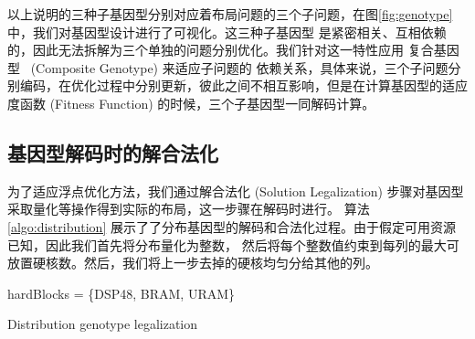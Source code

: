 以上说明的三种子基因型分别对应着布局问题的三个子问题，在图\ref{fig:genotype}中，我们对基因型设计进行了可视化。这三种子基因型
是紧密相关、互相依赖的，因此无法拆解为三个单独的问题分别优化。我们针对这一特性应用 复合基因型~\cite{opt4jpaper} (Composite Genotype) 来适应子问题的
依赖关系，具体来说，三个子问题分别编码，在优化过程中分别更新，彼此之间不相互影响，但是在计算基因型的适应度函数 (Fitness Function)
的时候，三个子基因型一同解码计算。


\subsection{基因型解码时的解合法化}

为了适应浮点优化方法，我们通过解合法化 (Solution Legalization) 步骤对基因型采取量化等操作得到实际的布局，这一步骤在解码时进行。
算法 \ref{algo:distribution} 展示了了分布基因型的解码和合法化过程。由于假定可用资源已知，因此我们首先将分布量化为整数，
然后将每个整数值约束到每列的最大可放置硬核数。然后，我们将上一步去掉的硬核均匀分给其他的列。

\begin{algorithm}
	
	hardBlocks = \{DSP48, BRAM, URAM\}\;

	\caption{Distribution genotype legalization}
	\label{algo:distribution}
\end{algorithm}

